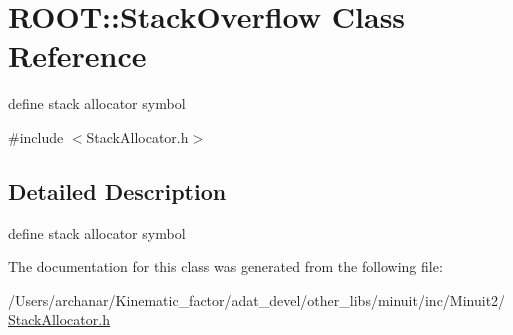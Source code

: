 \hypertarget{classROOT_1_1Minuit2_1_1StackOverflow}{}\section{R\+O\+OT\+:\+:Stack\+Overflow Class Reference}
\label{classROOT_1_1Minuit2_1_1StackOverflow}


define stack allocator symbol  




{\ttfamily \#include $<$Stack\+Allocator.\+h$>$}



\subsection{Detailed Description}
define stack allocator symbol 

The documentation for this class was generated from the following file\+:\begin{DoxyCompactItemize}
\item 
/\+Users/archanar/\+Kinematic\+\_\+factor/adat\+\_\+devel/other\+\_\+libs/minuit/inc/\+Minuit2/\mbox{\hyperlink{other__libs_2minuit_2inc_2Minuit2_2StackAllocator_8h}{Stack\+Allocator.\+h}}\end{DoxyCompactItemize}

